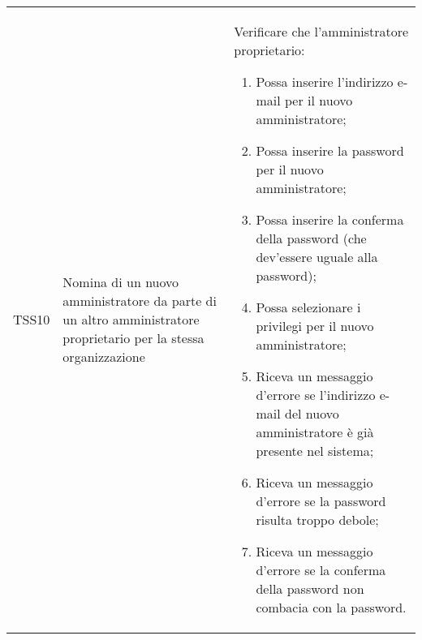 {\begin{longtable}{ c  C{3cm}  C{11cm} }
TSS10 & Nomina di un nuovo amministratore da parte di un altro amministratore proprietario per la stessa organizzazione & 
Verificare che l'amministratore proprietario:
\begin{enumerate}
    \item Possa inserire l'indirizzo e-mail per il nuovo amministratore;
    \item Possa inserire la password per il nuovo amministratore;
    \item Possa inserire la conferma della password (che dev'essere uguale alla password);
    \item Possa selezionare i privilegi per il nuovo amministratore;
    \item Riceva un messaggio d'errore se l'indirizzo e-mail del nuovo amministratore è già presente nel sistema;
    \item Riceva un messaggio d'errore se la password risulta troppo debole;
    \item Riceva un messaggio d'errore se la conferma della password non combacia con la password.
\end{enumerate} \\
\end{longtable}
}